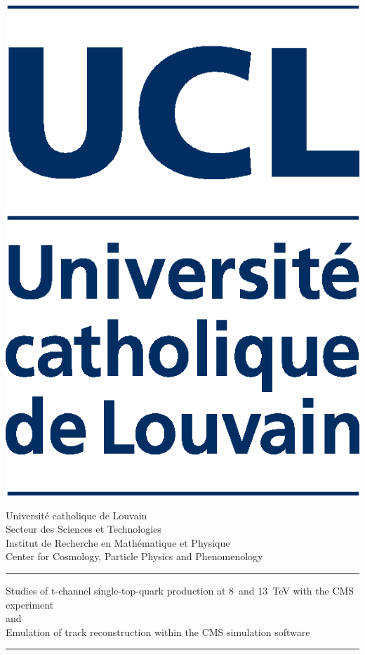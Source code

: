 \thispagestyle{empty}
\parbox{0.15\textwidth}{
\includegraphics[height=3.4\baselineskip]{figures/title/UCL.eps}
}\hfill\parbox{0.82\textwidth}{\small\raggedright
Universit{\'e} catholique de Louvain\\
Secteur des Sciences et Technologies\\ 
Institut de Recherche en Math{\'e}matique et Physique\\ 
Center for Cosmology, Particle Physics and Phenomenology
}

\vspace{2cm}

\begin{center}
{\rule{\textwidth}{1pt}}

\vspace{0.1cm}

\parbox{0.95\textwidth}{
\numberfont\Large\centering
Studies of t-channel single-top-quark production at 8~and 13~TeV with the CMS experiment\\
and\\
Emulation of track reconstruction within the CMS simulation software
}

\vspace{0.1cm}

{\rule{\textwidth}{1pt}}
\end{center}
\vspace{1.cm}

